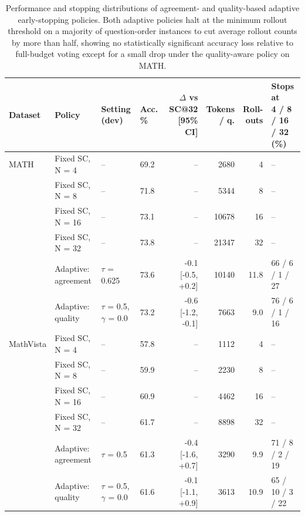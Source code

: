 \begin{table}[t]
\centering
\small
\caption{Performance and stopping distributions of agreement- and quality-based adaptive early-stopping policies. Both adaptive policies halt at the minimum rollout threshold on a majority of question-order instances to cut average rollout counts by more than half, showing no statistically significant accuracy loss relative to full-budget voting except for a small drop under the quality-aware policy on MATH.}
\label{tab:t3-adaptive}
\begin{tabular}{llllrrrl}
\toprule
Dataset & Policy & \makecell{Setting\\(dev)} & Acc. \% & \makecell{$\Delta$ vs SC@32\\{}[95\% CI]} & \makecell{Tokens\\/ q.} & \makecell{Roll-\\outs} & \makecell{Stops at\\4 / 8 / 16 / 32 (\%)} \\
\midrule
MATH & Fixed SC, N = 4 & – & 69.2 & – & 2680 & 4 & – \\
 & Fixed SC, N = 8 & – & 71.8 & – & 5344 & 8 & – \\
 & Fixed SC, N = 16 & – & 73.1 & – & 10678 & 16 & – \\
 & Fixed SC, N = 32 & – & 73.8 & – & 21347 & 32 & – \\
 & Adaptive: agreement & $\tau$ = 0.625 & 73.6 & -0.1 [-0.5, +0.2] & 10140 & 11.8 & 66 / 6 / 1 / 27 \\
 & Adaptive: quality & $\tau$ = 0.5, $\gamma$ = 0.0 & 73.2 & -0.6 [-1.2, -0.1] & 7663 & 9.0 & 76 / 6 / 1 / 16 \\
\midrule
MathVista & Fixed SC, N = 4 & – & 57.8 & – & 1112 & 4 & – \\
 & Fixed SC, N = 8 & – & 59.9 & – & 2230 & 8 & – \\
 & Fixed SC, N = 16 & – & 60.9 & – & 4462 & 16 & – \\
 & Fixed SC, N = 32 & – & 61.7 & – & 8898 & 32 & – \\
 & Adaptive: agreement & $\tau$ = 0.5 & 61.3 & -0.4 [-1.6, +0.7] & 3290 & 9.9 & 71 / 8 / 2 / 19 \\
 & Adaptive: quality & $\tau$ = 0.5, $\gamma$ = 0.0 & 61.6 & -0.1 [-1.1, +0.9] & 3613 & 10.9 & 65 / 10 / 3 / 22 \\
\bottomrule
\end{tabular}
\end{table}
